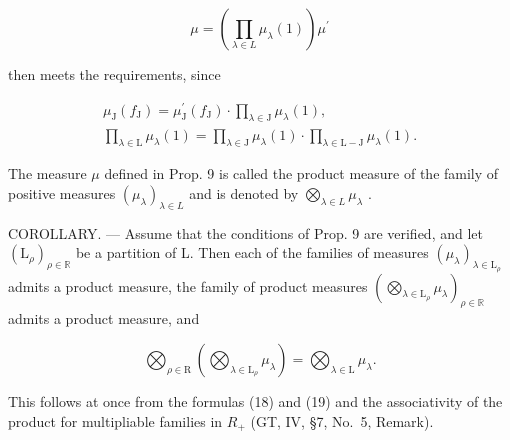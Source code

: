 \[
\mu = \left(\prod_ {\lambda \in L} \mu_ {\lambda} (1)\right) \mu^ {\prime}
\]

then meets the requirements, since

\[
\begin{array}{c} \mu_ {\mathrm{J}} (f _ {\mathrm{J}}) = \mu_ {\mathrm{J}} ^ {\prime} (f _ {\mathrm{J}}) \cdot \prod_ {\lambda \in \mathrm{J}} \mu_ {\lambda} (1), \\ \prod_ {\lambda \in \mathrm{L}} \mu_ {\lambda} (1) = \prod_ {\lambda \in \mathrm{J}} \mu_ {\lambda} (1) \cdot \prod_ {\lambda \in \mathrm{L} - \mathrm{J}} \mu_ {\lambda} (1). \end{array}
\]

The measure \(\mu\) defined in Prop. 9 is called the product measure of the family of positive measures \((\mu_{\lambda})_{\lambda \in L}\) and is denoted by \(\bigotimes_{\lambda \in L} \mu_{\lambda}\) .

COROLLARY. --- Assume that the conditions of Prop. 9 are verified, and let \((\mathrm{L}_{\rho})_{\rho\in\mathbb{R}}\) be a partition of L. Then each of the families of measures \((\mu_{\lambda})_{\lambda\in\mathrm{L}_{\rho}}\) admits a product measure, the family of product measures \(\left(\bigotimes_{\lambda\in\mathrm{L}_{\rho}}\mu_{\lambda}\right)_{\rho\in\mathbb{R}}\) admits a product measure, and

\[
\bigotimes_ {\rho \in \mathrm{R}} \left(\bigotimes_ {\lambda \in \mathrm{L} _ {\rho}} \mu_ {\lambda}\right) = \bigotimes_ {\lambda \in \mathrm{L}} \mu_ {\lambda}.\tag{20}
\]

This follows at once from the formulas (18) and (19) and the associativity of the product for multipliable families in \(R_{+}\) (GT, IV, §7, No.~5, Remark).

